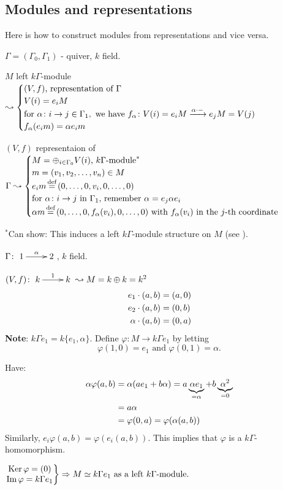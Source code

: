 \subsection{Modules and representations}
Here is how to construct modules from representations and vice versa.

$\Gamma = (\Gamma_0,\Gamma_1)$ - quiver, $k$ field.

$M$ left $k\Gamma$-module $\leadsto\begin{cases}
(V,f) \text{, representation of $\Gamma$}\\
V(i) = e_iM\\
\text{for\ } \alpha\colon i\to j \in \Gamma_1, \text{\ we have\ }  f_\alpha\colon
V(i)=e_iM\extto{\alpha\cdot -} e_jM = V(j)\\
f_\alpha(e_im) = \alpha e_im
\end{cases}$

$(V,f)$ representaion of $\Gamma\leadsto \begin{cases}
M = \oplus_{i\in\Gamma_0} V(i) \textrm{, $k\Gamma$-module}^*\\
m = (v_1,v_2,\ldots, v_n) \in M\\
e_im \defeq (0,\ldots,0,v_i,0,\ldots,0)\\
\text{for $\alpha\colon i\to j$ in $\Gamma_1$, remember $\alpha =
  e_j\alpha e_i$}\\
\alpha m \defeq (0,\ldots,0,f_\alpha(v_i),0,\ldots,0)
\text{\ with $f_\alpha(v_i)$ in the $j$-th coordinate}
\end{cases}$\medskip 

$^*$Can show: This induces a left $k\Gamma$-module structure on $M$
(see \cite[page 57]{ARS}). 
\begin{exam}
$\Gamma\colon \xymatrix{1\ar[r]^\alpha & 2}$, $k$ field.

$(V,f)\colon \xymatrix{k\ar[r]^1 & k} \leadsto M = k\oplus k = k^2$
\begin{align}
e_1\cdot (a,b) & = (a, 0)\notag\\
e_2\cdot (a,b) & = (0,b)\notag\\
\alpha\cdot(a,b) & = (0,a)\notag
\end{align}
\textbf{Note}: $k\Gamma e_1 = k\{ e_1,\alpha\}$.  Define $\varphi\colon M\to
k\Gamma e_1$ by letting 
\[\varphi(1,0) = e_1 \text{\ and\ } \varphi(0,1) = \alpha.\]

Have: 
\begin{align}
\alpha \varphi(a,b)  & = \alpha(ae_1 + b\alpha) =
a\underbrace{\alpha e_1}_{=\alpha} +
                       b\underbrace{\alpha^2}_{=0}\notag\\
& = a\alpha\notag\\
& = \varphi(0,a) = \varphi(\alpha(a,b))\notag
\end{align} 
Similarly, $e_i\varphi(a,b) = \varphi(e_i(a,b))$. This implies that
$\varphi$ is a $k\Gamma$-homomorphism.\medskip 

$\left.\begin{matrix}
\operatorname{Ker}\nolimits \varphi = (0)\\
\operatorname{Im}\nolimits\varphi = k\Gamma e_1
\end{matrix}\right\} \Rightarrow M\simeq k\Gamma e_1 \text{\ as a left $k\Gamma$-module}.$
\end{exam}

